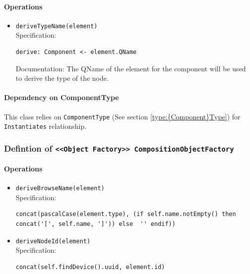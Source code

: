 \paragraph{Operations}
\begin{itemize}
  \item \texttt{deriveTypeName(element)}\\
    Specification:
   \indent \begin{Verbatim}[xleftmargin=.25in,fontsize=\small]
derive: Component <- element.QName
\end{Verbatim}

    Documentation: The QName of the element for the component will be used to derive the type of the node.

\end{itemize}
\paragraph{Dependency on {Component}Type}

This class relies on \texttt{{Component}Type} (See section \ref{type:{Component}Type}) for \texttt{Instantiates} relationship.

\FloatBarrier
\subsubsection{Defintion of \texttt{<<Object Factory>> CompositionObjectFactory}} \label{type:CompositionObjectFactory}

\FloatBarrier



\paragraph{Operations}
\begin{itemize}
  \item \texttt{deriveBrowseName(element)}\\
    Specification:
   \indent \begin{Verbatim}[xleftmargin=.25in,fontsize=\small]
concat(pascalCase(element.type), (if self.name.notEmpty() then concat('[', self.name, ']')) else  '' endif))
\end{Verbatim}

  \item \texttt{deriveNodeId(element)}\\
    Specification:
   \indent \begin{Verbatim}[xleftmargin=.25in,fontsize=\small]
concat(self.findDevice().uuid, element.id)
\end{Verbatim}

\end{itemize}
